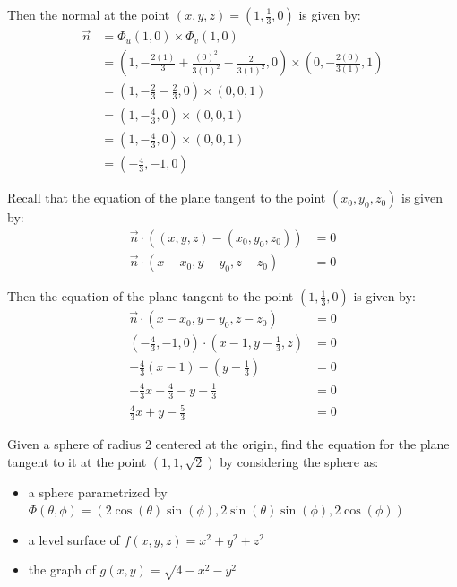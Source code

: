 \begin{solution}
    Then the normal at the point \((x, y, z) = \left(1, \frac{1}{3}, 0\right)\) is given by:
    \begin{align*}
        \vec{n} &= \Phi_u(1, 0) \times \Phi_v(1, 0) \\
        &= \left(1, -\frac{2(1)}{3} + \frac{(0)^2}{3(1)^2} - \frac{2}{3(1)^2}, 0\right) \times \left(0, - \frac{2(0)}{3(1)}, 1\right) \\
        &= \left(1, -\frac{2}{3} - \frac{2}{3}, 0\right) \times \left(0, 0, 1\right) \\
        &= \left(1, -\frac{4}{3}, 0\right) \times \left(0, 0, 1\right) \\
        &= \left(1, -\frac{4}{3}, 0\right) \times \left(0, 0, 1\right) \\
        &= \left(-\frac{4}{3}, -1, 0\right)
    \end{align*}
    
    Recall that the equation of the plane tangent to the point \((x_0, y_0, z_0)\) is given by:
    \begin{align}
        \vec{n} \cdot \left((x, y, z) - (x_0, y_0, z_0)\right) &= 0 \\
        \vec{n} \cdot \left(x - x_0, y - y_0, z - z_0\right) &= 0
    \end{align}
    
    Then the equation of the plane tangent to the point \(\left(1, \frac{1}{3}, 0\right)\) is given by:
    \begin{align*}
        \vec{n} \cdot \left(x - x_0, y - y_0, z - z_0\right) &= 0 \\
        \left(-\frac{4}{3}, -1, 0\right) \cdot \left(x - 1, y - \frac{1}{3}, z\right) &= 0 \\
        -\frac{4}{3}(x - 1) - \left(y - \frac{1}{3}\right) &= 0 \\
        -\frac{4}{3}x + \frac{4}{3} - y + \frac{1}{3} &= 0 \\
        \frac{4}{3}x + y - \frac{5}{3} &= 0
    \end{align*}
    
\end{solution}

\begin{tcolorbox}[
        title={Problem 18},
        valign=center,
        nobeforeafter,
        colframe=gray!95!black
    ]
    Given a sphere of radius 2 centered at the origin, find the equation for the plane tangent to it at the point \((1, 1, \sqrt{2})\) by considering the sphere as:
    
    \begin{itemize}
        \item a sphere parametrized by \(\Phi(\theta, \phi) = (2\cos(\theta)\sin(\phi), 2\sin(\theta)\sin(\phi), 2\cos(\phi))\)
        \item a level surface of \(f(x, y, z) = x^2 + y^2 + z^2\)
        \item the graph of \(g(x, y) = \sqrt{4 - x^2 - y^2}\)
    \end{itemize}
\end{tcolorbox}

